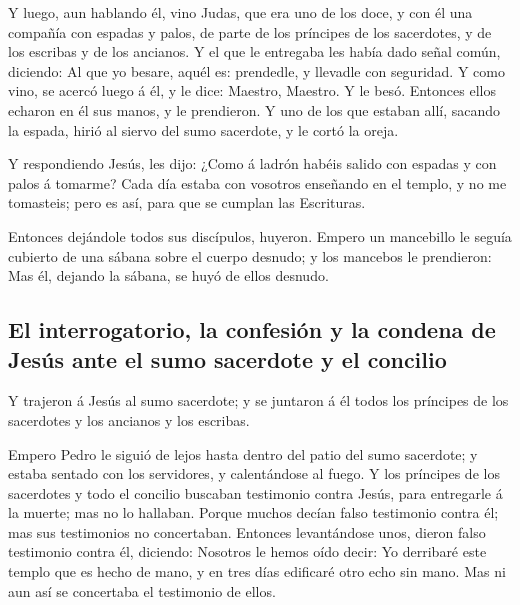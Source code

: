  Y luego, aun hablando él, vino Judas, que era uno de los
doce, y con él una compañía con espadas y palos, de parte de los
príncipes de los sacerdotes, y de los escribas y de los ancianos.
 Y el que le entregaba les había dado señal común,
diciendo: Al que yo besare, aquél es: prendedle, y llevadle con
seguridad.  Y como vino, se acercó luego á él, y le dice:
Maestro, Maestro. Y le besó.  Entonces ellos echaron en él
sus manos, y le prendieron.  Y uno de los que estaban allí,
sacando la espada, hirió al siervo del sumo sacerdote, y le cortó la
oreja.

 Y respondiendo Jesús, les dijo: ¿Como á ladrón habéis
salido con espadas y con palos á tomarme?  Cada día estaba
con vosotros enseñando en el templo, y no me tomasteis; pero es así,
para que se cumplan las Escrituras.

 Entonces dejándole todos sus discípulos, huyeron.
 Empero un mancebillo le seguía cubierto de una sábana
sobre el cuerpo desnudo; y los mancebos le prendieron:  Mas
él, dejando la sábana, se huyó de ellos desnudo.

\hypertarget{el-interrogatorio-la-confesiuxf3n-y-la-condena-de-jesuxfas-ante-el-sumo-sacerdote-y-el-concilio}{%
\subsection{El interrogatorio, la confesión y la condena de Jesús ante
el sumo sacerdote y el
concilio}\label{el-interrogatorio-la-confesiuxf3n-y-la-condena-de-jesuxfas-ante-el-sumo-sacerdote-y-el-concilio}}

 Y trajeron á Jesús al sumo sacerdote; y se juntaron á él
todos los príncipes de los sacerdotes y los ancianos y los escribas.

 Empero Pedro le siguió de lejos hasta dentro del patio del
sumo sacerdote; y estaba sentado con los servidores, y calentándose al
fuego.  Y los príncipes de los sacerdotes y todo el
concilio buscaban testimonio contra Jesús, para entregarle á la muerte;
mas no lo hallaban.  Porque muchos decían falso testimonio
contra él; mas sus testimonios no concertaban.  Entonces
levantándose unos, dieron falso testimonio contra él, diciendo:
 Nosotros le hemos oído decir: Yo derribaré este templo que
es hecho de mano, y en tres días edificaré otro echo sin mano.
 Mas ni aun así se concertaba el testimonio de ellos.

